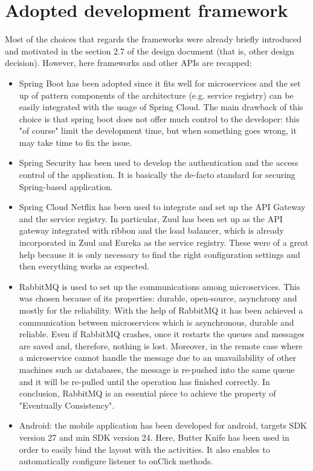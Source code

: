 \section{Adopted development framework}
Most of the choices that regards the frameworks were already briefly introduced and motivated in the
section 2.7 of the design document (that is, other design decision). 
However, here frameworks and other APIs are recapped:

\begin{itemize}

\item Spring\cite{spring} Boot has been adopted since it fits well for microservices and the set up of pattern components
of the architecture (e.g. service registry) can be easily integrated with the usage of Spring Cloud.
The main drawback of this choice is that spring boot does not offer much control to the developer: this "of
course" limit the development time, but when something goes wrong, it may take time to fix the issue.

\item Spring Security has been used to develop the authentication and the access control of the application.
It is basically the de-facto standard for securing Spring-based application. 

\item Spring Cloud Netflix has been used to integrate and set up the API Gateway and the service registry.
In particular, Zuul has been set up as the API gateway integrated with ribbon and the load balancer, which is already incorporated in Zuul and Eureka as the service registry. 
These were of a great help because it is only necessary to find the right configuration settings and then everything works as expected.

\item RabbitMQ\cite{rabbitMQ} is used to set up the communications among microservices. This was chosen because of its properties: durable, 
open-source, asynchrony and mostly for the reliability. With the help of RabbitMQ it has been achieved a communication 
between microservices which is asynchronous, durable and reliable. Even if RabbitMQ crashes, once it restarts the queues 
and messages are saved and, therefore, nothing is lost. Moreover, in the remote case where a microservice cannot handle 
the message due to an unavailability of other machines such as databases, the message is re-pushed into the same queue and it 
will be re-pulled until the operation has finished correctly. In conclusion, RabbitMQ is an essential piece to achieve the property 
of "Eventually Consistency".

\item Android: the mobile application has been developed for android, targets SDK version 27 and min SDK version 24. Here, Butter Knife has been used in order to easily bind the layout with the activities. It also enables to automatically configure listener to onClick methods.

\end{itemize}

